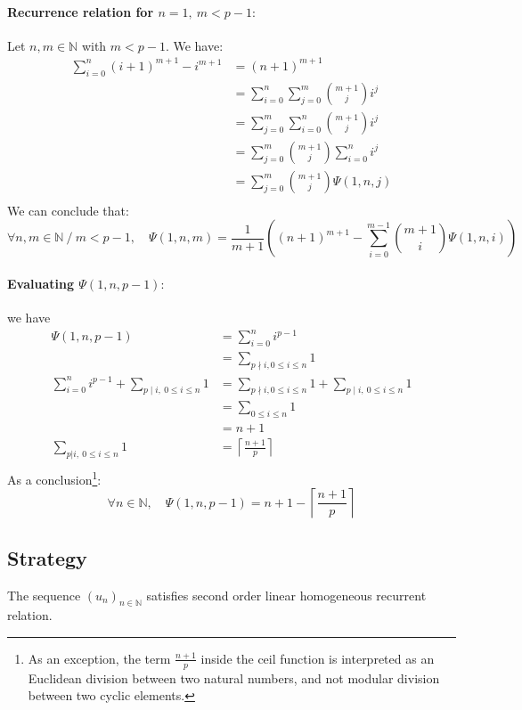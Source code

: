 \documentclass[]{article}
\begin{document}
\paragraph{Recurrence relation for $n=1,\ m<p-1: $} Let $n,m\in\mathbb{N}$ with $m<p-1.$ We have:
\begin{align*}
	\sum_{i=0}^{n}(i+1)^{m+1}-i^{m+1}&=(n+1)^{m+1}\\
	&=\sum_{i=0}^{n}\sum_{j=0}^{m} {m+1 \choose j}i^j\\
	&=\sum_{j=0}^{m}\sum_{i=0}^{n} {m+1 \choose j}i^j\\
	&=\sum_{j=0}^{m}{m+1 \choose j}\sum_{i=0}^{n} i^j\\
	&=\sum_{j=0}^m{m+1 \choose j}\Psi(1,n,j)\\
\end{align*}
We can conclude that:
$$
\boxed{\forall n,m\in\mathbb{N}\ /\ m<p-1,\quad\Psi(1,n,m)=\frac{1}{m+1}\left((n+1)^{m+1}-\sum_{i=0}^{m-1}{m+1 \choose i}\Psi(1,n,i)\right)}
$$

\paragraph{Evaluating $\Psi(1,n,p-1): $} we have
\begin{align*}
	\Psi(1,n,p-1)&= \sum_{i=0}^ni^{p-1}\\
	&= \sum_{p \nmid i,0\leq i \leq n} 1\\
	\sum_{i=0}^ni^{p-1}+\sum_{p\mid i, \ 0\leq i\leq n}1
	&=\sum_{p \nmid i,0\leq i \leq n} 1+ \sum_{p\mid i, \ 0\leq i\leq n}1\\
	&=\sum_{0\leq i \leq n} 1 \\
	&=n+1\\
	\sum_{p|i, \ 0\leq i\leq n}1&=\left\lceil\frac{n+1}{p}\right\rceil \\
\end{align*}
 As a conclusion\footnote{As an exception, the term $\frac{n+1}{p}$ inside the ceil function is interpreted as an Euclidean division between two natural numbers, and not modular division between two cyclic elements.}:
 $$
 \boxed{\forall n\in\mathbb{N},\quad \Psi(1,n,p-1) =n+1 -\left\lceil\frac{n+1}{p}\right\rceil}
 $$
 
 \pagebreak
\subsection{Strategy}
The sequence $(u_n)_{n\in\mathbb{N}}$ satisfies second order linear homogeneous recurrent relation.
\end{document}
